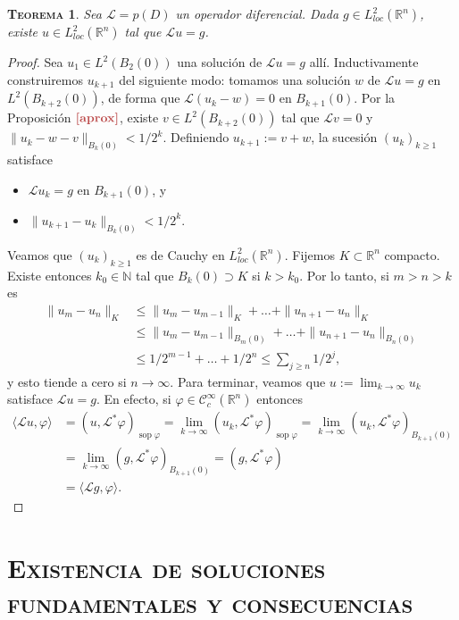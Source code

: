 \documentclass[11pt]{article}
\theoremstyle{colored}
\DeclareMathOperator{\sop}{sop}
\newtheorem{theorem}{\scshape Teorema}
\newcommand{\N}{\mathbb{N}}
\newcommand{\R}{\mathbb{R}}
\newcommand{\C}{\mathscr{C}}
\newcommand{\ev}[1]{\langle #1 \rangle}
\renewcommand{\L}{\mathscr{L}}
\newcommand{\paint}[1]{\color{color}{#1}}
\newcommand{\tpaint}[1]{\paint{\textbf{#1}}}
\begin{document}
\begin{theorem} \label{teo-sol-l2-loc}Sea $\L = p(D)$ un operador diferencial. Dada $g \in L^2_{loc}(\R^n)$, existe $u \in L^2_{loc}(\R^n)$ tal que $\L u = g$.
\end{theorem}
\begin{proof} Sea $u_1 \in L^2(B_2(0))$ una solución de $\L u = g$ allí. Inductivamente construiremos $u_{k+1}$ del siguiente modo: tomamos una solución $w$ de $\L u = g$ en $L^2(B_{k+2}(0))$, de forma que $\L (u_k-w) = 0$ en $B_{k+1}(0)$. Por la Proposición $\tpaint{\ref{aprox}}$, existe $v \in L^2(B_{k+2}(0))$ tal que $\L v = 0$ y $\|u_k-w-v\|_{B_{k}(0)} < 1/2^k$. Definiendo $u_{k+1} := v+w$, la sucesión $(u_k)_{k \geq 1}$ satisface
\begin{itemize}
\item $\L u_k = g$ en $B_{k+1}(0)$, y
\item $\|u_{k+1} - u_k\|_{B_k(0)} < 1/2^k$.
\end{itemize} 

Veamos que $(u_k)_{k \geq 1}$ es de Cauchy en $L_{loc}^2(\R^n)$. Fijemos $K \subset \R^n$ compacto. Existe entonces $k_0 \in \N$ tal que $B_k(0) \supset K$ si $k > k_0$. Por lo tanto, si $m > n > k$ es
\begin{align*}
\|u_m-u_n\|_K &\leq \|u_m-u_{m-1}\|_K + \dots + \|u_{n+1}-u_n\|_K\\
&\leq \|u_m-u_{m-1}\|_{B_m(0)} + \dots + \|u_{n+1}-u_n\|_{B_n(0)}\\
&\leq 1/2^{m-1} + \dots + 1/2^n \leq \sum_{j \geq n}1/2^j,
\end{align*}
y esto tiende a cero si $n \to \infty$. Para terminar, veamos que $u := \lim_{k \to \infty} u_k$ satisface $\L u = g$. En efecto, si $\varphi \in \C_c^\infty(\R^n)$ entonces
\begin{align*}
\ev{\L u, \varphi} &= (u,\L^\ast\varphi)_{\sop \varphi} = \lim_{k \to \infty}(u_k,\L^\ast\varphi)_{\sop \varphi} = \lim_{k \to \infty}(u_k,\L^\ast\varphi)_{B_{k+1}(0)}\\
&= \lim_{k \to \infty}(g,\L^\ast\varphi)_{B_{k+1}(0)} = (g,\L^\ast\varphi)\\
&= \ev{\L g, \varphi}.
\end{align*}
\end{proof}

\section{\scshape Existencia de soluciones fundamentales y consecuencias}
\end{document}

